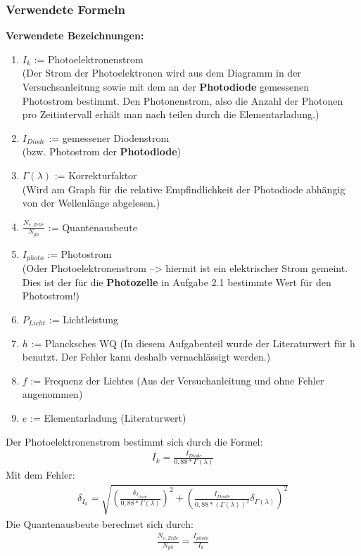 \documentclass[12px]{scrartcl}
\begin{document}
\subsubsection{Verwendete Formeln}
\textbf{Verwendete Bezeichnungen:}
\begin{enumerate}
\item $I_k$ := Photoelektronenstrom\\
(Der Strom der Photoelektronen wird aus dem Diagramm in der Versuchsanleitung sowie mit dem an der \textbf{Photodiode} gemessenen Photostrom bestimmt. Den Photonenstrom, also die Anzahl der Photonen pro Zeitintervall erhält man nach teilen durch die Elementarladung.)
\item $I_{Diode}$ := gemessener Diodenstrom\\
(bzw. Photostrom der \textbf{Photodiode})
\item $\Gamma(\lambda)$ := Korrekturfaktor\\
(Wird am Graph für die relative Empfindlichkeit der Photodiode abhängig von der Wellenlänge abgelesen.)
\item $\frac{N_{e,Zelle}}{N_{ph}}$ := Quantenausbeute
\item $I_{photo}$ := Photostrom\\
(Oder Photoelektronenstrom --> hiermit ist ein elektrischer Strom gemeint. Dies ist der für die \textbf{Photozelle} in Aufgabe 2.1 bestimmte Wert für den Photostrom!)
\item $P_{Licht}$ := Lichtleistung
\item $h$ := Plancksches WQ
(In diesem Aufgabenteil wurde der Literaturwert für h benutzt. Der Fehler kann deshalb vernachlässigt werden.)
\item $f$ := Frequenz der Lichtes
(Aus der Versuchanleitung und ohne Fehler angenommen)
\item $e$ := Elementarladung
(Literaturwert)
\end{enumerate}
Der Photoelektronenstrom bestimmt sich durch die Formel:
\begin{align}
I_k = \frac{I_{Diode}}{0,88*\Gamma(\lambda)}
\label{eqn:i_k}
\end{align}
Mit dem Fehler:
\begin{align}
\delta_{I_k} = \sqrt{
\left(\frac{\delta_{I_{Diode}}}{0,88*\Gamma(\lambda)}\right)^2+
\left(\frac{I_{Diode}}{0,88*(\Gamma(\lambda))^2}
\delta_{\Gamma(\lambda)}\right)^2}
\label{eqn:i_k_delta}
\end{align}
Die Quantenausbeute berechnet sich durch:
\begin{align}
\frac{N_{e,Zelle}}{N_{ph}} = \frac{I_{photo}}{I_{k}}
\end{align}
\end{document}
